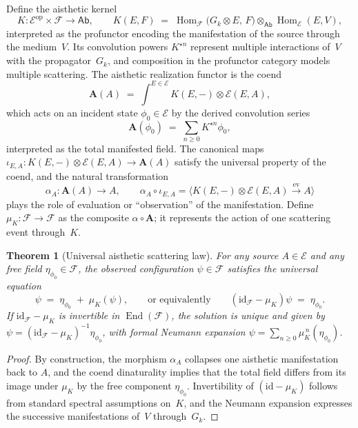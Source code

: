 \documentclass[12pt]{article}
\newcommand{\E}{\mathcal{E}}
\newcommand{\F}{\mathcal{F}}
\newcommand{\Ab}{\mathsf{Ab}}
\newcommand{\Hom}{\operatorname{Hom}}
\newcommand{\End}{\operatorname{End}}
\newcommand{\op}{\mathrm{op}}
\theoremstyle{plain}
\newtheorem{theorem}{Theorem}[section]
\theoremstyle{definition}
\theoremstyle{remark}
\numberwithin{equation}{section}
\begin{document}
Define the aisthetic kernel 
\[
K:\E^{\op}\times\F\longrightarrow\Ab,
\qquad 
K(E,F)\;=\;\Hom_{\F}\!\big(G_k\!\otimes\!E,\,F\big)\!\otimes_\Ab\!\Hom_{\E}(E,V),
\]
interpreted as the profunctor encoding the manifestation of the source through the medium~$V$.  Its convolution powers $K^{\star n}$ represent multiple interactions of~$V$ with the propagator~$G_k$, and composition in the profunctor category models multiple scattering.  The aisthetic realization functor is the coend
\[
\mathbf A(A)\;=\;\int^{E\in\E} K(E,-)\otimes \E(E,A),
\]
which acts on an incident state $\phi_0\in\E$ by the derived convolution series
\[
\mathbf A(\phi_0)\;=\;\sum_{n\ge0} K^{\star n}\phi_0,
\]
interpreted as the total manifested field.  The canonical maps $\iota_{E,A}:K(E,-)\otimes \E(E,A)\to \mathbf A(A)$ satisfy the universal property of the coend, and the natural transformation
\[
\alpha_A:\mathbf A(A)\longrightarrow A,
\qquad 
\alpha_A\circ\iota_{E,A}
=\bigl\langle K(E,-)\otimes\E(E,A)\xrightarrow{\mathrm{ev}}A\bigr\rangle
\]
plays the role of evaluation or ``observation'' of the manifestation.  Define $\mu_K:\F\to\F$ as the composite $\alpha\circ\mathbf A$; it represents the action of one scattering event through~$K$.

\begin{theorem}[Universal aisthetic scattering law]\label{th:universal-A}
For any source $A\in\E$ and any free field $\eta_{\phi_0}\in\F$, the observed configuration $\psi\in\F$ satisfies the universal equation
\[
\psi\;=\;\eta_{\phi_0}\;+\;\mu_K(\psi),
\qquad\text{or equivalently}\qquad
(\mathrm{id}_\F-\mu_K)\psi\;=\;\eta_{\phi_0}.
\]
If $\mathrm{id}_\F-\mu_K$ is invertible in $\End(\F)$, the solution is unique and given by 
$\psi=(\mathrm{id}_\F-\mu_K)^{-1}\eta_{\phi_0}$, with formal Neumann expansion
$\psi=\sum_{n\ge0}\mu_K^{\,n}(\eta_{\phi_0})$.  
\end{theorem}

\begin{proof}
By construction, the morphism $\alpha_A$ collapses one aisthetic manifestation back to $A$, and the coend dinaturality implies that the total field differs from its image under $\mu_K$ by the free component $\eta_{\phi_0}$.  Invertibility of $(\mathrm{id}-\mu_K)$ follows from standard spectral assumptions on~$K$, and the Neumann expansion expresses the successive manifestations of~$V$ through~$G_k$. 
\end{proof}
\end{document}
